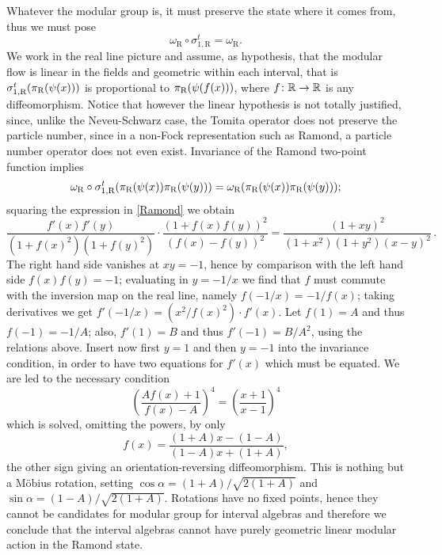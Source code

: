 Whatever the modular group is, it must preserve the state 
where it comes from, thus we must pose 
\[
\omega_{\textrm{R}}\circ\sigma_{1,\textrm{R}}^t=
\omega_{\textrm{R}}.
\]
We work in the real line picture and assume, as 
hypothesis, that the modular flow is linear in the fields and 
geometric within each interval, that is 
$\sigma_{1,\textrm{R}}^t(\pi_{\textrm{R}}(\psi(x)))$ is proportional to 
$\pi_{\textrm{R}}(\psi(f(x)))$, where $f\colon\mathbb{R}\to\mathbb{R}$ is any diffeomorphism.
Notice that however the linear hypothesis is not 
totally justified, since, unlike the Neveu-Schwarz case,
the Tomita operator does not preserve the particle number,
since in a non-Fock representation such as Ramond, a particle
number operator does not even exist.
Invariance of the Ramond two-point function implies
\[
\omega_{\textrm{R}}\circ\sigma_{1,\textrm{R}}^t
(\pi_{\textrm{R}}(\psi(x))\pi_{\textrm{R}}(\psi(y)))=
\omega_{\textrm{R}}(\pi_{\textrm{R}}(\psi(x))\pi_{\textrm{R}}(\psi(y)));
\]
squaring the expression in \eqref{Ramond} we obtain 
\[
\frac{f'(x)f'(y)}{(1+f(x)^2)(1+f(y)^2)}\cdot 
\frac{(1+f(x)f(y))^2}{(f(x)-f(y))^2}=
\frac{(1+xy)^2}{(1+x^2)(1+y^2)(x-y)^2}\,.
\]
The right hand side vanishes at $xy=-1$, hence by 
comparison with the left hand side 
$f(x)f(y)=-1$; evaluating in $y=-1/x$
we find that $f$ must commute with the inversion map 
on the real line, namely $f(-1/x)=-1/f(x)$; taking 
derivatives we get $f'(-1/x)=(x^2/f(x)^2)\cdot f'(x)$.
Let $f(1)=A$ and thus $f(-1)=-1/A$; also, $f'(1)=B$ and 
thus $f'(-1)=B/A^2$, using the relations above. Insert 
now first $y=1$ and then $y=-1$ into the invariance 
condition, in order to have two equations for $f'(x)$ which
must be equated. We are led to the necessary condition
\[
\left(\frac{Af(x)+1}{f(x)-A}\right)^4=
\left(\frac{x+1}{x-1}\right)^4
\]
which is solved, omitting the powers, by only
\[
f(x)=\frac{(1+A)x-(1-A)}{(1-A)x + (1+A)},
\]
the other sign giving an orientation-reversing 
diffeomorphism. This is nothing but a M\"obius
rotation, setting $\cos \alpha =(1+A)/\sqrt{2(1+A)}$
and $\sin \alpha =(1-A)/\sqrt{2(1+A)}$. Rotations have 
no fixed points, hence they cannot be candidates 
for modular group for interval algebras and therefore 
we conclude that the interval algebras cannot have purely 
geometric linear modular action in the Ramond state.



 
 
